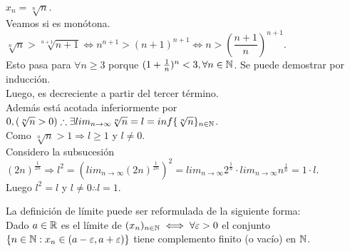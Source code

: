 \begin{eg}
  $x_n = \sqrt[n]{n}$. \\
  Veamos si es monótona. $\sqrt[n]{n} > \sqrt[n+1]{n+1} \iff n^{n+1} > (n+1)^{n+1} \iff n > (\dfrac{n+1}{n})^{n+1}$. \\
  Esto pasa para $\forall n \geq 3$ porque $(1+\frac{1}{n})^n < 3, \forall n \in \mathbb{N}$. Se puede demostrar por inducción. \\
  Luego, es decreciente a partir del tercer término. \\
  Además está acotada inferiormente por $0, (\sqrt[n]{n} > 0) \therefore \exists lim_{n \to \infty} \sqrt[n]{n} = l = inf\{ \sqrt[n]{n} \}_{n \in \mathbb{N}}$. \\
  Como $\sqrt[n]{n} > 1 \Rightarrow l \geq 1$ y $l \neq 0$. \\
  Considero la subsucesión $(2n)^{\frac{1}{2n}} \Rightarrow l^2 = (lim_{n \to \infty} (2n)^{\frac{1}{2n}})^2 = lim_{n \to \infty} 2^{\frac{1}{n}} \cdot lim_{n \to \infty} n^{\frac{1}{n}} = 1 \cdot l$. \\
  Luego $l^2 = l$ y $l \neq 0 \therefore l = 1$.
\end{eg}

\begin{note}
  La definición de límite puede ser reformulada de la siguiente forma: \\
  Dado $a \in \mathbb{R}$ es el límite de $(x_n)_{n \in \mathbb{N}} \iff \forall \varepsilon > 0$ el conjunto $\{ n \in \mathbb{N} : x_n \in (a - \varepsilon, a + \varepsilon) \}$ tiene complemento finito (o vacío) en $\mathbb{N}$.
\end{note}

